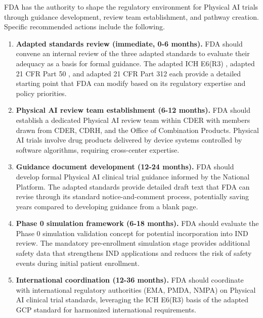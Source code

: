 FDA has the authority to shape the regulatory environment for Physical AI
trials through guidance development, review team establishment, and pathway
creation. Specific recommended actions include the following.

\begin{enumerate}[nosep]
  \item \textbf{Adapted standards review (immediate, 0-6 months).} FDA should
    convene an internal review of the three adapted standards to evaluate
    their adequacy as a basis for formal guidance. The adapted ICH E6(R3)
    \cite{ich-adapt}, adapted 21 CFR Part 50 \cite{cfr50-adapt}, and adapted
    21 CFR Part 312 \cite{cfr312-adapt} each provide a detailed starting
    point that FDA can modify based on its regulatory expertise and policy
    priorities.

  \item \textbf{Physical AI review team establishment (6-12 months).} FDA
    should establish a dedicated Physical AI review team within CDER with
    members drawn from CDER, CDRH, and the Office of Combination Products.
    Physical AI trials involve drug products delivered by device systems
    controlled by software algorithms, requiring cross-center expertise.

  \item \textbf{Guidance document development (12-24 months).} FDA should
    develop formal Physical AI clinical trial guidance informed by the
    National Platform. The adapted standards provide detailed draft text that
    FDA can revise through its standard notice-and-comment process, potentially
    saving years compared to developing guidance from a blank page.

  \item \textbf{Phase 0 simulation framework (6-18 months).} FDA should
    evaluate the Phase 0 simulation validation concept for potential
    incorporation into IND review. The mandatory pre-enrollment simulation
    stage provides additional safety data that strengthens IND applications
    and reduces the risk of safety events during initial patient enrollment.

  \item \textbf{International coordination (12-36 months).} FDA should
    coordinate with international regulatory authorities (EMA, PMDA, NMPA)
    on Physical AI clinical trial standards, leveraging the ICH E6(R3) basis
    of the adapted GCP standard for harmonized international requirements.
\end{enumerate}

